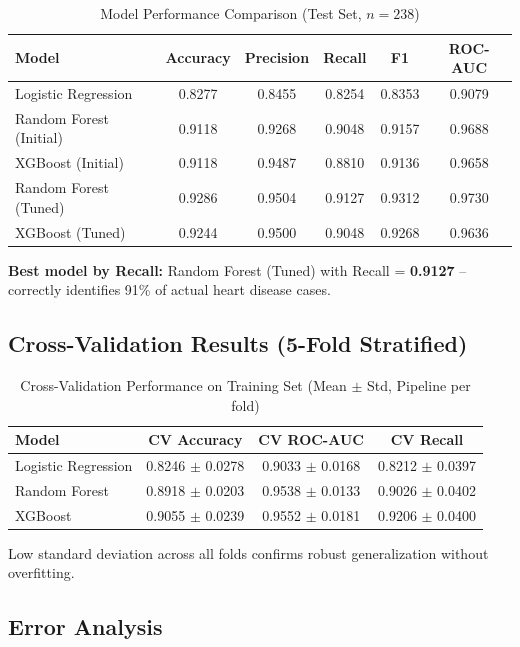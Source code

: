 \documentclass[12pt,a4paper]{article}
\begin{document}
\begin{table}[H]
\centering
\caption{Model Performance Comparison (Test Set, $n = 238$)}
\label{tab:results}
\begin{tabular}{|l|c|c|c|c|c|}
\hline
\textbf{Model} & \textbf{Accuracy} & \textbf{Precision} & \textbf{Recall} & \textbf{F1} & \textbf{ROC-AUC} \\
\hline
Logistic Regression & 0.8277 & 0.8455 & 0.8254 & 0.8353 & 0.9079 \\
Random Forest (Initial) & 0.9118 & 0.9268 & 0.9048 & 0.9157 & 0.9688 \\
XGBoost (Initial) & 0.9118 & 0.9487 & 0.8810 & 0.9136 & 0.9658 \\
Random Forest (Tuned) & 0.9286 & 0.9504 & 0.9127 & 0.9312 & 0.9730 \\
XGBoost (Tuned) & 0.9244 & 0.9500 & 0.9048 & 0.9268 & 0.9636 \\
\hline
\end{tabular}
\end{table}

\textbf{Best model by Recall:} Random Forest (Tuned) with Recall = \textbf{0.9127} -- correctly identifies 91\% of actual heart disease cases.

\subsection{Cross-Validation Results (5-Fold Stratified)}

\begin{table}[H]
\centering
\caption{Cross-Validation Performance on Training Set (Mean $\pm$ Std, Pipeline per fold)}
\begin{tabular}{|l|c|c|c|}
\hline
\textbf{Model} & \textbf{CV Accuracy} & \textbf{CV ROC-AUC} & \textbf{CV Recall} \\
\hline
Logistic Regression & 0.8246 $\pm$ 0.0278 & 0.9033 $\pm$ 0.0168 & 0.8212 $\pm$ 0.0397 \\
Random Forest & 0.8918 $\pm$ 0.0203 & 0.9538 $\pm$ 0.0133 & 0.9026 $\pm$ 0.0402 \\
XGBoost & 0.9055 $\pm$ 0.0239 & 0.9552 $\pm$ 0.0181 & 0.9206 $\pm$ 0.0400 \\
\hline
\end{tabular}
\end{table}

Low standard deviation across all folds confirms robust generalization without overfitting.

\subsection{Error Analysis}
\end{document}

